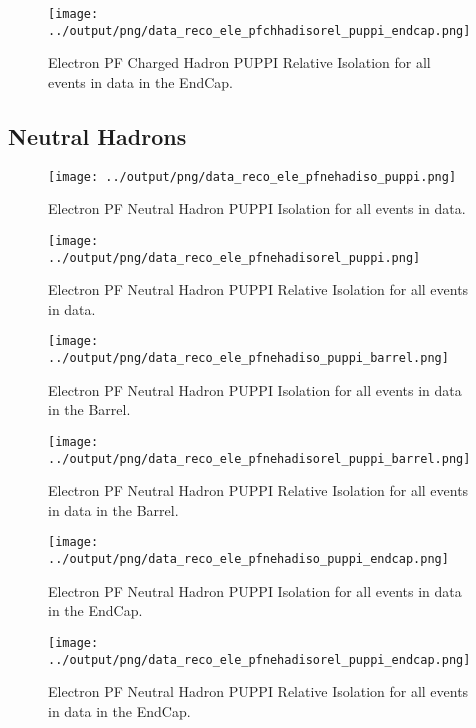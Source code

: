 \documentclass[11pt]{book}
\begin{document}
\begin{figure}[htb]
\centering
\texttt{[image: ../output/png/data\_reco\_ele\_pfchhadisorel\_puppi\_endcap.png]}
\caption{Electron PF Charged Hadron PUPPI Relative Isolation for all events in data in the EndCap.}
\label{fig:data_ele_pfchhadisorel_puppi_endcap}
\end{figure}
\clearpage

\subsection{Neutral Hadrons}
\begin{figure}[htb]
\centering
\texttt{[image: ../output/png/data\_reco\_ele\_pfnehadiso\_puppi.png]}
\caption{Electron PF Neutral Hadron PUPPI Isolation for all events in data.}
\label{fig:data_ele_pfnehadiso_puppi}
\end{figure}

\begin{figure}[htb]
\centering
\texttt{[image: ../output/png/data\_reco\_ele\_pfnehadisorel\_puppi.png]}
\caption{Electron PF Neutral Hadron PUPPI Relative Isolation for all events in data.}
\label{fig:data_ele_pfnehadisorel_puppi}
\end{figure}

\begin{figure}[htb]
\centering
\texttt{[image: ../output/png/data\_reco\_ele\_pfnehadiso\_puppi\_barrel.png]}
\caption{Electron PF Neutral Hadron PUPPI Isolation for all events in data in the Barrel.}
\label{fig:data_ele_pfnehadiso_puppi_barrel}
\end{figure}

\begin{figure}[htb]
\centering
\texttt{[image: ../output/png/data\_reco\_ele\_pfnehadisorel\_puppi\_barrel.png]}
\caption{Electron PF Neutral Hadron PUPPI Relative Isolation for all events in data in the Barrel.}
\label{fig:data_ele_pfnehadisorel_puppi_barrel}
\end{figure}

\begin{figure}[htb]
\centering
\texttt{[image: ../output/png/data\_reco\_ele\_pfnehadiso\_puppi\_endcap.png]}
\caption{Electron PF Neutral Hadron PUPPI Isolation for all events in data in the EndCap.}
\label{fig:data_ele_pfnehadiso_puppi_endcap}
\end{figure}

\begin{figure}[htb]
\centering
\texttt{[image: ../output/png/data\_reco\_ele\_pfnehadisorel\_puppi\_endcap.png]}
\caption{Electron PF Neutral Hadron PUPPI Relative Isolation for all events in data in the EndCap.}
\label{fig:data_ele_pfnehadisorel_puppi_endcap}
\end{figure}
\clearpage
\end{document}
